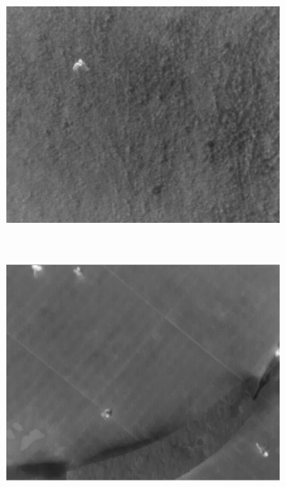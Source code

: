 \begin{figure}[h]
    \centering
    \begin{subfigure}[h]{0.3\textwidth}
        \includegraphics[width=\textwidth]{figures/红外图像预处理结果1.jpg}
    \end{subfigure}
    ~
    \begin{subfigure}[h]{0.3\textwidth}
        \includegraphics[width=\textwidth]{figures/红外图像预处理结果2.jpg}
    \end{subfigure}
    ~
    \begin{subfigure}[h]{0.3\textwidth}

\end{subfigure}
\end{figure}
